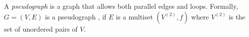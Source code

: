 \documentclass{article}
\begin{document}
A \emph{pseudograph} is a graph that allows both parallel edges and loops.
Formally, $G=(V, E)$ is a pseudograph , if $E$ is a multiset $(V^{(2)}, f)$
where $V^{(2)}$ is the set of unordered pairs of $V$.
\end{document}
